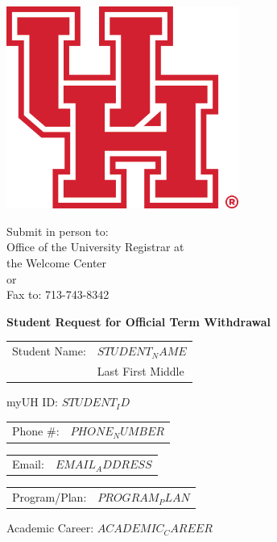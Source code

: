 \documentclass[11pt]{article}
\newcommand{\studentName}{$STUDENT_NAME$}
\newcommand{\studentID}{$STUDENT_ID$}
\newcommand{\phoneNumber}{$PHONE_NUMBER$}
\newcommand{\emailAddress}{$EMAIL_ADDRESS$}
\newcommand{\programPlan}{$PROGRAM_PLAN$}
\newcommand{\academicCareer}{$ACADEMIC_CAREER$}
\begin{document}
\thispagestyle{empty}

\begin{minipage}{0.5\textwidth}
  \includegraphics[width=3in]{./university_logo.png}
\end{minipage}
\begin{minipage}{0.5\textwidth}
  \raggedleft
  Submit in person to:\\
  Office of the University Registrar at\\
  the Welcome Center\\
  or\\
  Fax to: 713-743-8342
\end{minipage}

\begin{center}
  \textbf{\Large Student Request for Official Term Withdrawal}
\end{center}

\noindent\begin{tabular}{@{}p{1.8in}p{4.5in}@{}}
Student Name: & \underline{\studentName} \\
 & \scriptsize{Last \hspace{1.5in} First \hspace{1.5in} Middle} \\
\end{tabular}
\hfill myUH ID: \underline{\studentID}

\noindent\begin{tabular}{@{}p{1.8in}p{4.5in}@{}}
Phone \#: & \underline{\phoneNumber} \\
\end{tabular}
\noindent\begin{tabular}{@{}p{1.8in}p{4.5in}@{}}
Email: & \underline{\emailAddress} \\
\end{tabular}

\noindent\begin{tabular}{@{}p{1.8in}p{4.5in}@{}}
Program/Plan: & \underline{\programPlan} \\
\end{tabular}
\hfill Academic Career: \underline{\academicCareer}
\end{document}
